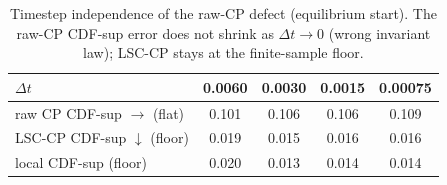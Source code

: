 \begin{table}[t]
\centering\small
\caption{Timestep independence of the raw-CP defect (equilibrium start). The raw-CP CDF-sup error
does not shrink as $\Delta t\to0$ (wrong invariant law); LSC-CP stays at the finite-sample floor.}
\label{tab:move1-timestep}
\begin{tabular}{lcccc}
\toprule
$\Delta t$ & 0.0060 & 0.0030 & 0.0015 & 0.00075 \\
\midrule
raw CP CDF-sup $\to$ (flat) & 0.101 & 0.106 & 0.106 & 0.109 \\
LSC-CP CDF-sup $\downarrow$ (floor) & 0.019 & 0.015 & 0.016 & 0.016 \\
local CDF-sup (floor)       & 0.020 & 0.013 & 0.014 & 0.014 \\
\bottomrule
\end{tabular}
\end{table}
